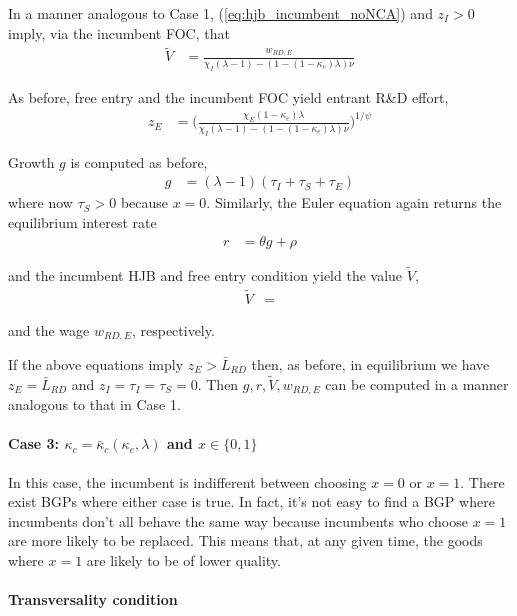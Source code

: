 \documentclass[11pt,english]{article}
\theoremstyle{remark}
\begin{document}
In a manner analogous to Case 1, (\ref{eq:hjb_incumbent_noNCA}) and $z_I > 0$ imply, via the incumbent FOC, that
\begin{align}
\tilde{V} &= \frac{w_{RD,E}}{\chi_I(\lambda - 1) - (1-(1-\kappa_{e})\lambda)\nu} \label{eq:hjb_incumbent_foc_noNCA}
\end{align}

As before, free entry and the incumbent FOC yield entrant R\&D effort, 
\begin{align}
	z_E &= \Big( \frac{\chi_E (1-\kappa_{e}) \lambda}{\chi_I(\lambda-1) - (1-(1-\kappa_e)\lambda)\nu } \Big)^{1/\psi} \label{eq:effort_entrant_case2}
\end{align}

Growth $g$ is computed as before,
\begin{align}
g &= (\lambda - 1)(\tau_I + \tau_S + \tau_E) \label{eq:growth_accounting_noNCA}
\end{align}
where now $\tau_S > 0$ because $x = 0$. Similarly, the Euler equation again returns the equilibrium interest rate 
\begin{align*}
	r &= \theta g + \rho
\end{align*}

and the incumbent HJB and free entry condition yield the value $\tilde{V}$,
\begin{align}
	\tilde{V} &= 
\end{align} 

and the wage $w_{RD,E}$, respectively. 

If the above equations imply $z_E > \bar{L}_{RD}$ then, as before, in equilibrium we have $z_E = \bar{L}_{RD}$ and $z_I = \tau_I = \tau_S = 0$. Then $g,r,\tilde{V},w_{RD,E}$ can be computed in a manner analogous to that in Case 1.  

\paragraph{Case 3: $\kappa_c = \bar{\kappa}_c(\kappa_e,\lambda)$ and $x \in \{0,1\}$}

In this case, the incumbent is indifferent between choosing $x = 0$ or $x = 1$. There exist BGPs where either case is true. In fact, it's not easy to find a BGP where incumbents don't all behave the same way because incumbents who choose $x = 1$ are more likely to be replaced. This means that, at any given time, the goods where $x = 1$ are likely to be of lower quality. 

\paragraph{Transversality condition}
\end{document}
